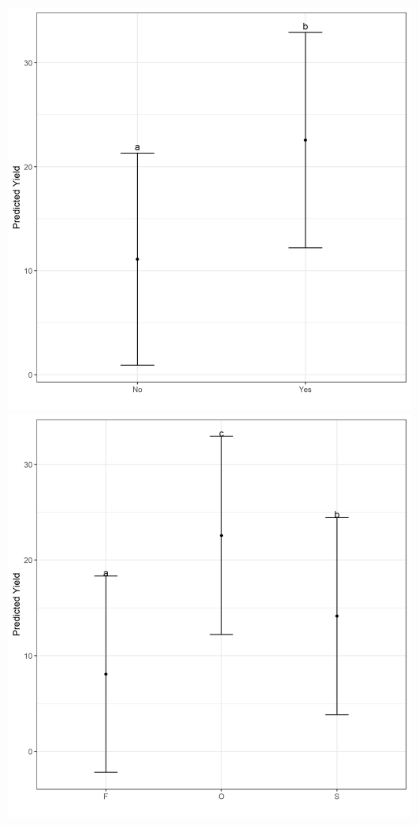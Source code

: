 \documentclass[a4paper, 10pt, fleqn, twosided]{memoir}
\begin{document}
\begin{tcolorbox}[title = Exercise 17 output continued]
\includegraphics[width=0.8\textwidth, frame]{Exercise17ControlPred.png}
\includegraphics[width=0.8\textwidth, frame]{Exercise17SeasonPred.png}
\end{tcolorbox}
\end{document}
